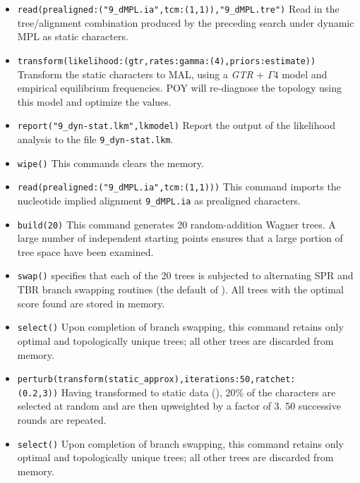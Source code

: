 \begin{itemize}
\item \texttt{read(prealigned:("9\_dMPL.ia",tcm:(1,1)),"9\_dMPL.tre")} Read in the tree/alignment 
combination produced by the preceding search under dynamic MPL as static characters.
\item \texttt{transform(likelihood:(gtr,rates:gamma:(4),priors:estimate))} Transform the static characters to MAL, 
using a \emph{GTR} + $\Gamma 4$ model and empirical equilibrium frequencies. POY will re-diagnose the topology 
using this model and optimize the values.
\item \texttt{report("9\_dyn-stat.lkm",lkmodel)} Report the output of the likelihood analysis to
 the file \texttt{9\_dyn-stat.lkm}.
\item \texttt{wipe()} This commands clears the memory.

\item \texttt{read(prealigned:("9\_dMPL.ia",tcm:(1,1)))} This command imports the nucleotide implied 
alignment \texttt{9\_dMPL.ia} as prealigned characters.
\item \texttt{build(20)} This command generates 20 random-addition Wagner trees. A large number of 
independent starting points ensures that a large portion of tree space have been examined.
\item \texttt{swap()}  specifies that each of the 20 trees is subjected to alternating SPR and 
TBR branch swapping routines (the default of \poy). All trees with the optimal score found are stored in memory.
\item \texttt{select()} Upon completion of branch swapping, this command retains only optimal and topologically 
unique trees; all other trees are discarded from memory. 
\item \texttt{perturb(transform(static\_approx),iterations:50,ratchet:\\(0.2,3))} Having transformed to static data 
(), 20\% of the characters are selected at random and are then upweighted by 
a factor of $3$.  50 successive rounds are repeated. 
\item \texttt{select()} Upon completion of branch swapping, this command retains only optimal and topologically 
unique trees; all other trees are discarded from memory.
 

\end{itemize}
